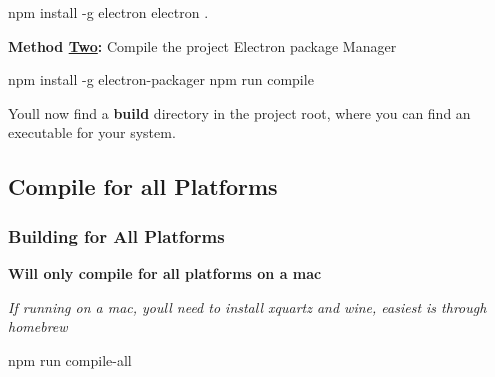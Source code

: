 \begin{DoxyCode}
npm install -g electron
electron .
\end{DoxyCode}


{\bfseries Method \mbox{\hyperlink{struct_two}{Two}}\+:} Compile the project Electron package Manager


\begin{DoxyCode}
npm install -g electron-packager
npm run compile
\end{DoxyCode}


You\textquotesingle{}ll now find a {\bfseries build} directory in the project root, where you can find an executable for your system.

\subsection*{Compile for all Platforms}

\subsubsection*{Building for All Platforms}

{\bfseries Will only compile for all platforms on a mac}

{\itshape If running on a mac, you\textquotesingle{}ll need to install xquartz and wine, easiest is through homebrew}


\begin{DoxyCode}
npm run compile-all
\end{DoxyCode}
 